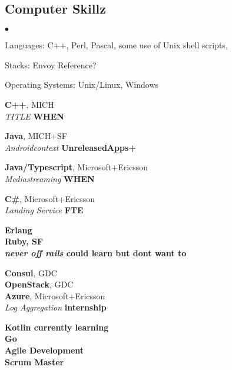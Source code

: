 \documentclass[margin,line]{res}
\newenvironment{list2}{
  \begin{list}{$\bullet$}{
      \setlength{\itemsep}{0in}
      \setlength{\parsep}{0in} \setlength{\parskip}{0in}
      \setlength{\topsep}{0in} \setlength{\partopsep}{0in} 
      \setlength{\leftmargin}{0.2in}}}{\end{list}}
\begin{document}
\begin{resume}
\section{\sc Computer Skillz} 
\begin{list2}
\item Languages:  C++, Perl, Pascal, some use of Unix shell scripts,
\item Stacks: Envoy Reference?
\item Operating Systems:  Unix/Linux, Windows
\end{list2}

{\bf C++}, MICH\\
{\em TITLE} \hfill {\bf  WHEN}

{\bf Java}, MICH+SF\\
{\em Androidcontext} \hfill {\bf UnreleasedApps+ }

{\bf Java/Typescript}, Microsoft+Ericsson\\
{\em Mediastreaming } \hfill {\bf WHEN}

{\bf {C\#}}, Microsoft+Ericsson\\
{\em Landing Service} \hfill {\bf  FTE}

\bf Erlang\\

{\bf Ruby}, SF\\
{\em never off rails} \hfill could learn but dont want to

{\bf Consul}, GDC\\
{\bf OpenStack}, GDC\\

{\bf Azure}, Microsoft+Ericsson\\
{\em Log Aggregation} \hfill {\bf internship}

{\bf Kotlin currently learning}\\
{\bf Go}\\

\bf Agile Development\\
\bf Scrum Master\\


\end{resume}
\end{document}
